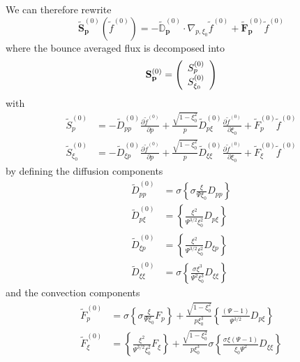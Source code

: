 We can therefore rewrite
\[
\widetilde{\mathbf{S}}_{\mathbf{p}}^{(0)}\left(  \widetilde{f}^{(0)}\right)
=-\widetilde{\mathbb{{D}}}_{\mathbf{p}}^{(0)}\cdot\nabla_{p,\xi_{0}}%
\widetilde{f}^{(0)}+\widetilde{\mathbf{F}}_{\mathbf{p}}^{(0)}\widetilde
{f}^{(0)}%
\]
where the bounce averaged flux is decomposed into
\begin{equation}
\mathbf{S}_{\mathbf{p}}^{(0)}=\left(
\begin{array}
[c]{l}%
S_{p}^{(0)}\\
S_{\xi_{0}}^{(0)}%
\end{array}
\right)
\end{equation}
with
\begin{align}
\widetilde{S}_{p}^{(0)} &  =-\widetilde{D}_{pp}^{(0)}\frac{\partial
\widetilde{f}^{(0)}}{\partial p}+\frac{\sqrt{1-\xi_{0}^{2}}}{p}\widetilde
{D}_{p\xi}^{(0)}\frac{\partial\widetilde{f}^{(0)}}{\partial\xi_{0}}%
+\widetilde{F}_{p}^{(0)}\widetilde{f}^{(0)}\label{sp0tdev}\\
\widetilde{S}_{\xi_{0}}^{(0)} &  =-\widetilde{D}_{\xi p}^{(0)}\frac
{\partial\widetilde{f}^{(0)}}{\partial p}+\frac{\sqrt{1-\xi_{0}^{2}}}%
{p}\widetilde{D}_{\xi\xi}^{(0)}\frac{\partial\widetilde{f}^{(0)}}{\partial
\xi_{0}}+\widetilde{F}_{\xi}^{(0)}\widetilde{f}^{(0)}%
\end{align}
by defining the diffusion components
\begin{align}
\widetilde{D}_{pp}^{(0)} &  =\sigma\left\{  \sigma\frac{\xi}{\Psi\xi_{0}%
}D_{pp}\right\}  \label{diffbavdkepp}\\
\widetilde{D}_{p\xi}^{(0)} &  =\left\{  \frac{\xi^{2}}{\Psi^{3/2}\xi_{0}^{2}%
}D_{p\xi}\right\}  \label{diffbavdkepm}\\
\widetilde{D}_{\xi p}^{(0)} &  =\left\{  \frac{\xi^{2}}{\Psi^{3/2}\xi_{0}^{2}%
}D_{\xi p}\right\}  \label{diffbavdkemp}\\
\widetilde{D}_{\xi\xi}^{(0)} &  =\sigma\left\{  \frac{\sigma\xi^{3}}{\Psi
^{2}\xi_{0}^{3}}D_{\xi\xi}\right\}  \label{diffbavdkemm}%
\end{align}
and the convection components
\begin{align}
\widetilde{F}_{p}^{(0)} &  =\sigma\left\{  \sigma\frac{\xi}{\Psi\xi_{0}}%
F_{p}\right\}  +\frac{\sqrt{1-\xi_{0}^{2}}}{p\xi_{0}^{3}}\left\{
\frac{\left(  \Psi-1\right)  }{\Psi^{3/2}}D_{p\xi}\right\}
\label{convbavdkep}\\
\widetilde{F}_{\xi}^{(0)} &  =\left\{  \frac{\xi^{2}}{\Psi^{3/2}\xi_{0}^{2}%
}F_{\xi}\right\}  +\frac{\sqrt{1-\xi_{0}^{2}}}{p\xi_{0}^{3}}\sigma\left\{
\frac{\sigma\xi\left(  \Psi-1\right)  }{\xi_{0}\Psi^{2}}D_{\xi\xi}\right\}
\label{convbavdkem}%
\end{align}
